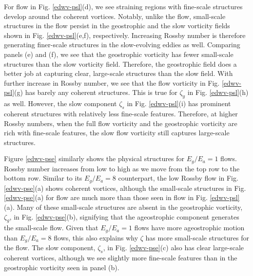 \documentclass[../Rajarshi-thesis-draft.tex]{subfiles}
\begin{document}
 For \ire flow in Fig. \ref{edwv-psl}(d), we see straining regions with fine-scale structures develop around the coherent vortices. Notably, unlike the \lre flow, small-scale structures in the \ire flow persist in the geostrophic and the slow vorticity fields shown in Fig. \ref{edwv-psl}(e,f), respectively. Increasing Rossby number is therefore generating finer-scale structures in the slow-evolving eddies as well. Comparing panels (e) and (f), we see that the  geostrophic vorticity has fewer small-scale structures than the slow vorticity field. Therefore, the geostrophic field does a better job at capturing clear, large-scale structures than the slow field.  With further increase in Rossby number, we see that the \hre flow vorticity in Fig. \ref{edwv-psl}(g) has barely any coherent structures. This is true for $\zeta_g$ in Fig. \ref{edwv-psl}(h) as well. However, the slow component $\zeta_s$ in Fig. \ref{edwv-psl}(i) has prominent coherent structures with relatively less fine-scale features. Therefore, at higher Rossby numbers, when the full flow vorticity and the geostrophic vorticity are rich with fine-scale features, the slow flow vorticity still captures large-scale structures. 

 
 
 
 
 
 
 
 

 Figure \ref{edwv-pse} similarly shows the physical structures for $E_g/E_a = 1$ flows. Rossby number increases from low to high as we move from the top row to the bottom row. Similar to its $E_g/E_a = 8$ counterpart, the low Rossby \lro flow in Fig. \ref{edwv-pse}(a) shows coherent vortices, although the small-scale structures in Fig. \ref{edwv-pse}(a) for \lro flow are much more than those seen in \lre flow in Fig. \ref{edwv-psl}(a). Many of these small-scale structures are absent in the geostrophic vorticity, $\zeta_g$, in Fig. \ref{edwv-pse}(b), signifying that the ageostrophic component generates the small-scale flow. Given that $E_g/E_a = 1$ flows have more ageostrophic motion than $E_g/E_a = 8$ flows, this also explains why $\zeta$ has more small-scale structures for the \lro flow. The slow component, $\zeta_s$, in Fig. \ref{edwv-pse}(c) also has clear large-scale coherent vortices, although we see slightly more fine-scale features than in the geostrophic vorticity seen in panel (b). 
\end{document}
